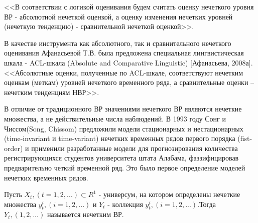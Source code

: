 <<В соответствии с логикой оценивания будем считать оценку нечеткого
уровня ВР - абсолютной нечеткой оценкой, а оценку изменения нечетких
уровней (нечеткую тенденцию) - сравнительной нечеткой оценкой>>.

В качестве инструмента как абсолютного, так и сравнительного нечеткого оценивания
Афанасьевой Т.В. была предложена специальная лингвистическая шкала - 
ACL-шкала (Absolute and Comparative Linguistic) [Афанасьева, 2008а]. 
<<Абсолютные оценки, полученные по ACL-шкале, соответствуют нечетким оценкам (меткам) уровней нечеткого временного ряда, а сравнительные оценки – нечетким тенденциям НВР>>.


В отличие от традиционного ВР значениями нечеткого ВР являются нечеткие множества, а не действительные числа наблюдений. В 1993 году Сонг и Чиссом(Song, Chissom) предложили модели стационарных и нестационарных (time-invariant и time-variant) нечетких временных рядов первого порядка (fist-order) и применили разработанные модели для прогнозирования количества регистрирующихся студентов университета штата Алабама, фаззифицировав предварительно четкий временной ряд. Это было первое определение моделей нечетких временных рядов. 

Пусть $X_t, (t=1,2,...) \subset R^1 $ - универсум, на котором определены нечеткие множества $y^i_t, (i=1,2,...)$ и $Y_t$ - коллекция $y_t^i, (i=1,2,...)$.Тогда $Y_t, (1,2,...)$ называется нечетким ВР.

